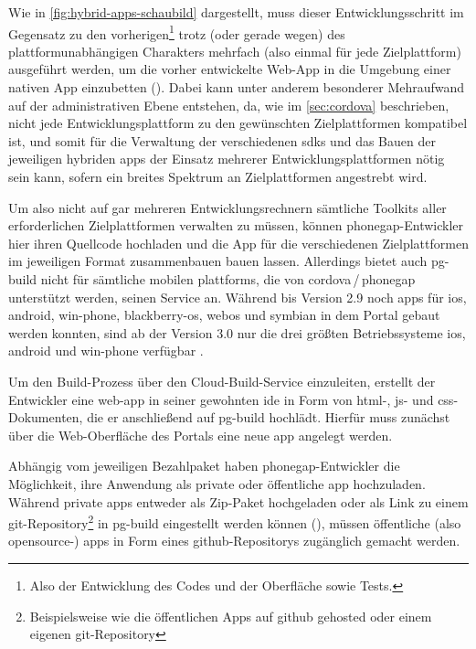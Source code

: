 {Wie in \autoref{fig:hybrid-apps-schaubild} dargestellt, muss dieser Entwicklungsschritt im Gegensatz zu den vorherigen\footnote{Also der Entwicklung des Codes und der Oberfläche sowie Tests.} trotz (oder gerade wegen) des plattformunabhängigen Charakters mehrfach (also einmal für jede Zielplattform) ausgeführt werden, um die vorher entwickelte Web-App in die Umgebung einer nativen App einzubetten ().
Dabei kann unter anderem besonderer Mehraufwand auf der administrativen Ebene entstehen, da, wie im \autoref{sec:cordova} beschrieben, nicht jede Entwicklungsplattform zu den gewünschten Zielplattformen kompatibel ist, und somit für die Verwaltung der verschiedenen \glspl{sdk} und das Bauen der jeweiligen hybriden \glspl{app} der Einsatz mehrerer Entwicklungsplattformen nötig sein kann, sofern ein breites Spektrum an Zielplattformen angestrebt wird.

Um also nicht auf gar mehreren Entwicklungsrechnern sämtliche Toolkits aller erforderlichen Zielplattformen verwalten zu müssen, können \gls{phonegap}-Entwickler hier ihren Quellcode hochladen und die App für die verschiedenen Zielplattformen im jeweiligen Format zusammenbauen bauen lassen.
Allerdings bietet auch \gls{pg-build} nicht für sämtliche mobilen \glspl{plattform}, die von \gls{cordova}\,/\,\gls{phonegap} unterstützt werden, seinen Service an.
Während bis Version 2.9 noch \glspl{app} für \gls{ios}, \gls{android}, \gls{win-phone}, \gls{blackberry-os}, \gls{webos} und \gls{symbian} in dem Portal gebaut werden konnten,
sind ab der Version 3.0 nur die drei größten Betriebssysteme \gls{ios}, \gls{android} und \gls{win-phone} verfügbar \cite{PhoneGap_Build_Documentation_Supported-Platforms}. 

Um den Build-Prozess über den Cloud-Build-Service einzuleiten, erstellt der Entwickler eine \gls{web-app} in seiner gewohnten \gls{ide} in Form von \gls{html}-, \gls{js}- und \gls{css}-Dokumenten, die er anschließend auf \gls{pg-build} hochlädt.
Hierfür muss zunächst über die Web-Oberfläche des Portals eine neue \gls{app} angelegt werden.

Abhängig vom jeweiligen Bezahlpaket haben \gls{phonegap}-Entwickler die Möglichkeit, ihre Anwendung als private oder öffentliche \gls{app} hochzuladen. 
Während private \glspl{app} entweder als Zip-Paket hochgeladen oder als Link zu einem \gls{git}-Repository\footnote{Beispielsweise wie die öffentlichen Apps auf \gls{github} gehosted oder einem eigenen \gls{git}-Repository} in \gls{pg-build} eingestellt werden können (), müssen öffentliche (also \gls{opensource}-) \glspl{app} in Form eines \gls{github}-Repositorys zugänglich gemacht werden.

}
